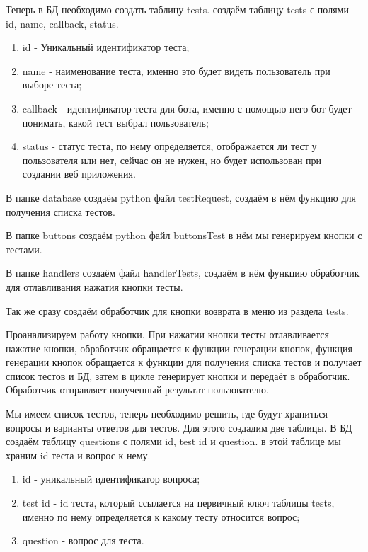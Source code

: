 \documentclass[12pt, oldlfont, amsfonts]{report}
\begin{document}
Теперь в БД необходимо создать таблицу { tests}. создаём таблицу { tests} с полями { id}, { name}, { callback}, { status}.

\begin{enumerate}
\item { id} - Уникальный идентификатор теста;
\item { name} - наименование теста, именно это будет видеть пользователь при выборе теста;
\item { callback} - идентификатор теста для бота, именно с помощью него бот будет понимать, какой тест выбрал пользователь;
\item { status} - статус теста, по нему определяется, отображается ли тест у пользователя или нет, сейчас он не нужен, но будет использован при создании веб приложения.
\end{enumerate}	


В папке database создаём python файл { testRequest}, создаём в нём функцию для получения списка тестов.

В папке buttons создаём python файл { buttonsTest} в нём мы генерируем кнопки с тестами.

В папке handlers создаём файл { handlerTests}, создаём в нём функцию обработчик для отлавливания нажатия кнопки { тесты}. 

Так же сразу создаём обработчик для кнопки возврата в меню из раздела { tests}.

Проанализируем работу кнопки. При нажатии кнопки { тесты} отлавливается нажатие кнопки, обработчик обращается к функции генерации кнопок, функция генерации кнопок обращается к функции для получения списка тестов и получает список тестов и БД, затем в цикле генерирует кнопки и передаёт в обработчик. Обработчик отправляет полученный результат пользователю.

Мы имеем список тестов, теперь необходимо решить, где будут храниться вопросы и варианты ответов для тестов. Для этого создадим две таблицы. В БД создаём таблицу { questions} с полями { id}, { test id} и { question}. в этой таблице мы храним { id} теста и { вопрос} к нему. 
\begin{enumerate}
\item { id} - уникальный идентификатор вопроса;
\item { test id} - id теста, который ссылается на первичный ключ таблицы { tests}, именно по нему определяется к какому тесту относится вопрос;
\item { question} - вопрос для теста.
\end{enumerate}	
\end{document}
